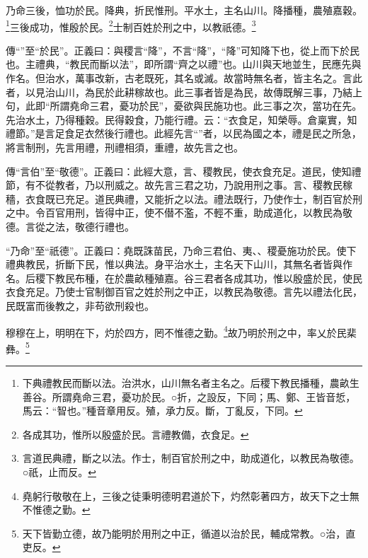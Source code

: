 乃命三後，恤功於民。降典，折民惟刑。平水土，主名山川。降播種，農殖嘉穀。\footnote{下典禮教民而斷以法。治洪水，山川無名者主名之。后稷下教民播種，農畝生善谷。所謂堯命三君，憂功於民。○折，之設反，下同；馬、鄭、王皆音悊，馬云：“智也。”種音章用反。殖，承力反。斷，丁亂反，下同。}三後成功，惟殷於民。\footnote{各成其功，惟所以殷盛於民。言禮教備，衣食足。}士制百姓於刑之中，以教祇德。\footnote{言道民典禮，斷之以法。作士，制百官於刑之中，助成道化，以教民為敬德。○祇，止而反。}


{\noindent\zhuan{}\fzbyks 傳“”至“於民”。正義曰：與稷言“降”，不言“降”，“降”可知降下也，從上而下於民也。主禮典，“教民而斷以法”，即所謂“齊之以禮”也。山川與天地並生，民應先與作名。但治水，萬事改新，古老既死，其名或滅。故當時無名者，皆主名之。言此者，以見治山川，為民於此耕稼故也。此三事者皆是為民，故傳既解三事，乃結上句，此即“所謂堯命三君，憂功於民”，憂欲與民施功也。此三事之次，當功在先。先治水土，乃得種穀。民得穀食，乃能行禮。云：“衣食足，知榮辱。倉稟實，知禮節。”是言足食足衣然後行禮也。此經先言“”者，以民為國之本，禮是民之所急，將言制刑，先言用禮，刑禮相須，重禮，故先言之也。 \par}

{\noindent\zhuan{}\fzbyks 傳“言伯”至“敬德”。正義曰：此經大意，言、稷教民，使衣食充足。道民，使知禮節，有不從教者，乃以刑威之。故先言三君之功，乃說用刑之事。言、稷教民稼穡，衣食既已充足。道民典禮，又能折之以法。禮法既行，乃使作士，制百官於刑之中。令百官用刑，皆得中正，使不僣不濫，不輕不重，助成道化，以教民為敬德。言從之法，敬德行禮也。 \par}

{\noindent\shu{}\fzkt “乃命”至“祇德”。正義曰：堯既誅苗民，乃命三君伯、夷、、稷憂施功於民。使下禮典教民，折斷下民，惟以典法。身平治水土，主名天下山川，其無名者皆與作名。后稷下教民布種，在於農畝種殖嘉。谷三君者各成其功，惟以殷盛於民，使民衣食充足。乃使士官制御百官之姓於刑之中正，以教民為敬德。言先以禮法化民，民既富而後教之，非苟欲刑殺也。 \par}

穆穆在上，明明在下，灼於四方，罔不惟德之勤。\footnote{堯躬行敬敬在上，三後之徒秉明德明君道於下，灼然彰著四方，故天下之士無不惟德之勤。}故乃明於刑之中，率乂於民棐彝。\footnote{天下皆勤立德，故乃能明於用刑之中正，循道以治於民，輔成常教。○治，直吏反。}


